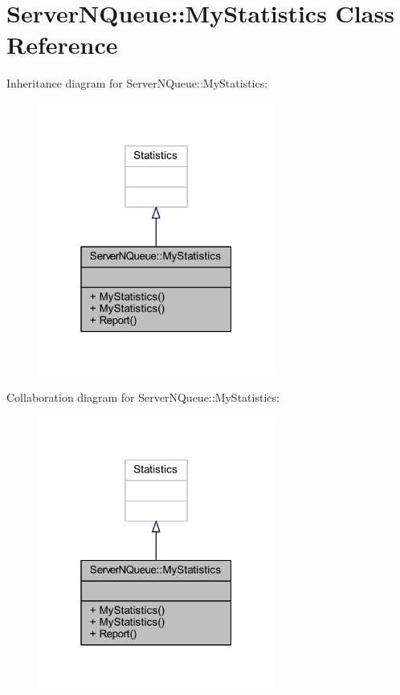\hypertarget{class_server_n_queue_1_1_my_statistics}{}\section{Server\+N\+Queue\+:\+:My\+Statistics Class Reference}
\label{class_server_n_queue_1_1_my_statistics}


Inheritance diagram for Server\+N\+Queue\+:\+:My\+Statistics\+:\nopagebreak
\begin{figure}[H]
\begin{center}
\leavevmode
\includegraphics[width=220pt]{class_server_n_queue_1_1_my_statistics__inherit__graph}
\end{center}
\end{figure}


Collaboration diagram for Server\+N\+Queue\+:\+:My\+Statistics\+:\nopagebreak
\begin{figure}[H]
\begin{center}
\leavevmode
\includegraphics[width=220pt]{class_server_n_queue_1_1_my_statistics__coll__graph}
\end{center}
\end{figure}
